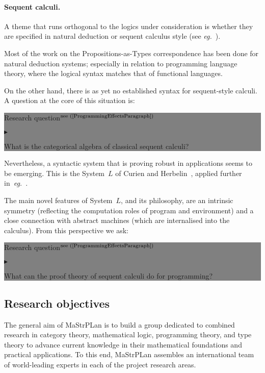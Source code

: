\documentclass[11pt,twocolumn]{article}
\newenvironment{btritemize}
  {\begin{list}{\btr}
  {\setlength{\topsep}{2pt}
   \setlength{\partopsep}{2pt}
   \setlength{\itemsep}{2.5pt}
   \setlength{\parsep}{2.5pt}
   \setlength{\leftmargin}{1em}
   \setlength{\labelwidth}{.5em}}}
  {\end{list}}
\newcommand{\mytextsf}[1]{\textsf{\small #1}}
\newcommand{\erc}{{\small\sf MaStrPLan}}
\newcommand{\eg}{\emph{eg.}}
\newcommand{\SystemL}{\mbox{System~$L$}}
\newcommand{\btr}{$\blacktriangleright$}
\newcommand{\reqpsize}{8.113395cm}%
\newcommand{\req}[2]{\begin{center}\colorbox{grey}{\begin{minipage}{\reqpsize} 
  \mytextsf{Research question}\hfill$^{\mbox{\scriptsize see #1 }}$\\[-5.5mm]
  \begin{btritemize}
  \item #2
  \end{btritemize}
\end{minipage}}\end{center}}
\begin{document}
\paragraph{Sequent calculi.}
\label{SequentCalculiParagraph}

A theme that runs orthogonal to the logics under consideration is whether
they are specified in natural deduction or sequent calculus
style (see \eg~\cite{vonPlato}).

Most of the work on the Propositions-as-Types correspondence has been done for
natural deduction systems; especially in relation to programming language
theory, where the logical syntax matches that of functional languages.  

On the other hand, there is as yet no established syntax for sequent-style
calculi.  A question at the core of this situation is:
%
\req{(\ref{ProgrammingEffectsParagraph})}
  {What is the categorical algebra of classical sequent calculi?}
%
Nevertheless, a syntactic system that is proving robust in applications
seems to be emerging.  This is the {\SystemL} of Curien and
Herbelin~\cite{CurienHerbelin}, applied further
in~\eg~\cite{Wadler,Munch,CurienMunch}.

The main novel features of {\SystemL}, and its philosophy, are an
intrinsic symmetry (reflecting the computation roles of program and
environment) and a close connection with abstract machines (which are
internalised into the calculus).  From this perspective we ask:
%
\req{(\ref{ProgrammingEffectsParagraph})}
  {What can the proof theory of sequent calculi do for programming?}

\subsection{Research objectives}
\label{ObjectivesSubsection}

The general aim of {\erc} is to build a group dedicated to combined
research in category theory, mathematical logic, programming theory, and
type theory to advance current knowledge in their mathematical foundations
and practical applications.  To this end, {\erc} assembles an
international team of world-leading experts in each of the project
research areas.  
\end{document}
